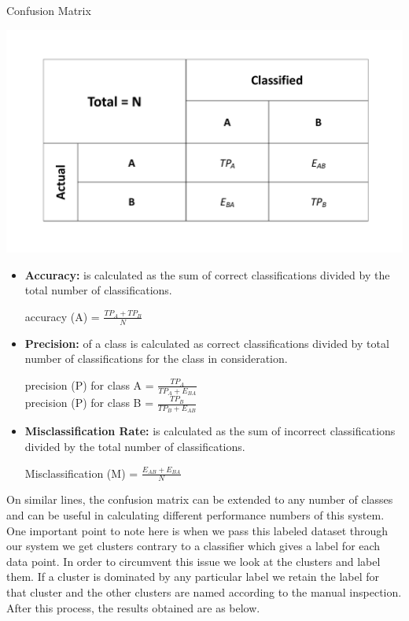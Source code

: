 \begin{table}[t]
	
	\caption{Confusion Matrix}%
	\centerline{\includegraphics[scale = 0.5]{confusion.pdf}}	
\end{table}

\begin{itemize}
	\item \textbf{Accuracy:} is calculated as the sum of correct classifications divided by the total number of classifications.
	\begin{center}
		\centering accuracy (A) = $ \frac{TP_A + TP_B}{N}$
	\end{center}
	 

	\item \textbf{Precision:} of a class is calculated as correct classifications divided by total number of classifications for the class in consideration.
	\begin{center}
		\centering precision (P) for class A = $ \frac{TP_A}{TP_A + E_{BA}}$ \\
		\centering precision (P) for class B = $ \frac{TP_B}{TP_B + E_{AB}}$
	\end{center}
	
	\item \textbf{Misclassification Rate:} is calculated as the sum of incorrect classifications divided by the total number of classifications.
	\begin{center}
		\centering Misclassification (M) = $ \frac{E_{AB} + E_{BA}}{N}$
	\end{center}
	
\end{itemize}

On similar lines, the confusion matrix can be extended to any number of classes and can be useful in calculating different performance numbers of this system. One important point to note here is when we pass this labeled dataset through our system we get clusters contrary to a classifier which gives a label for each data point. In order to circumvent this issue we look at the clusters and label them. If a cluster is dominated by any particular label we retain the label for that cluster and the other clusters are named according to the manual inspection. After this process, the results obtained are as below. 



